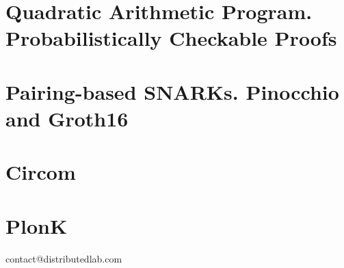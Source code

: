 \documentclass{zkdl-template-105x135-nohead}
\begin{document}
    \label{secation:circuits}

    \section[Quadratic Arithmetic Program]{Quadratic Arithmetic Program. Probabilistically Checkable Proofs}

    

    \section[Pairing-based SNARKs]{Pairing-based SNARKs. Pinocchio and Groth16}

    

    \section{Circom}

    

    \section{PlonK}

    


    \newpage
    \pagestyle{empty}
    
    \ifodd\value{page}
        \newpage
    \fi
    
    \vspace*{\fill}
    
    \begin{center}
        contact@distributedlab.com
    \end{center}
    
    \vspace*{\fill}
\end{document}
